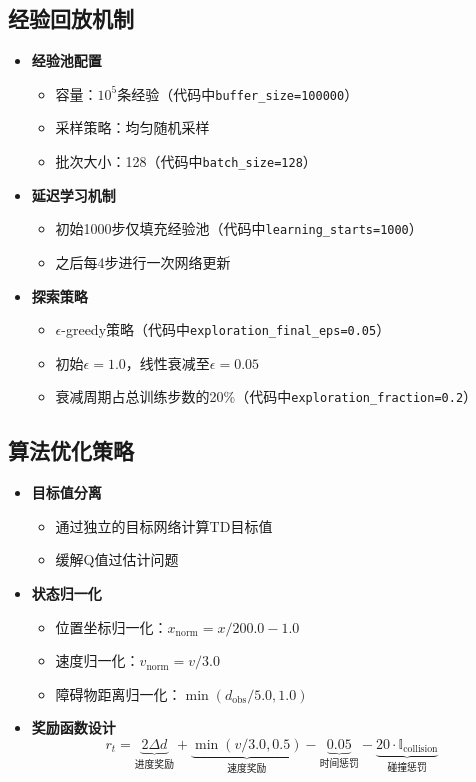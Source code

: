 \subsection{经验回放机制}
\begin{itemize}
    \item \textbf{经验池配置}
    \begin{itemize}
        \item 容量：$10^5$条经验（代码中\texttt{buffer\_size=100000}）
        \item 采样策略：均匀随机采样
        \item 批次大小：128（代码中\texttt{batch\_size=128}）
    \end{itemize}
    
    \item \textbf{延迟学习机制}
    \begin{itemize}
        \item 初始1000步仅填充经验池（代码中\texttt{learning\_starts=1000}）
        \item 之后每4步进行一次网络更新
    \end{itemize}
    
    \item \textbf{探索策略}
    \begin{itemize}
        \item $\epsilon$-greedy策略（代码中\texttt{exploration\_final\_eps=0.05}）
        \item 初始$\epsilon=1.0$，线性衰减至$\epsilon=0.05$
        \item 衰减周期占总训练步数的20\%（代码中\texttt{exploration\_fraction=0.2}）
    \end{itemize}
\end{itemize}

\subsection{算法优化策略}
\begin{itemize}
    \item \textbf{目标值分离}
    \begin{itemize}
        \item 通过独立的目标网络计算TD目标值
        \item 缓解Q值过估计问题
    \end{itemize}
    
    \item \textbf{状态归一化}
    \begin{itemize}
        \item 位置坐标归一化：$x_{\text{norm}} = x/200.0 - 1.0$
        \item 速度归一化：$v_{\text{norm}} = v/3.0$
        \item 障碍物距离归一化：$\min(d_{\text{obs}}/5.0, 1.0)$
    \end{itemize}
    
    \item \textbf{奖励函数设计}
    \[
    r_t = \underbrace{2\Delta d}_{\text{进度奖励}} + \underbrace{\min(v/3.0, 0.5)}_{\text{速度奖励}} - \underbrace{0.05}_{\text{时间惩罚}} - \underbrace{20\cdot\mathbb{I}_{\text{collision}}}_{\text{碰撞惩罚}}
    \]
\end{itemize}

